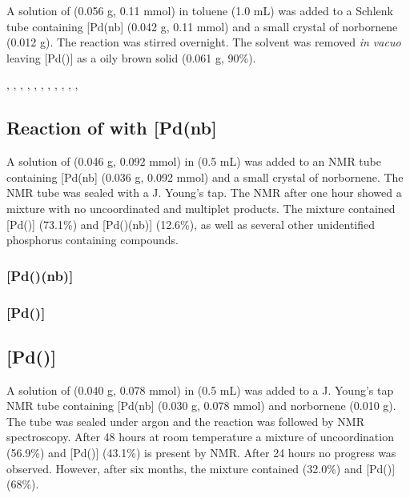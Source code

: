 A solution of \tButhixantphos{} (0.056 g, 0.11 mmol) in toluene (1.0 mL) was added to a Schlenk tube containing [Pd(nb] (0.042 g, 0.11 mmol) and a small crystal of norbornene (0.012 g).  The reaction was stirred overnight.  The solvent was removed \emph{in vacuo} leaving [Pd(\tButhixantphos)] as a oily brown solid (0.061 g, 90\%).

,
,
,
,
,
,
,
,
,
,
,

\subsection*{Reaction of \tBuxantphos{} with [Pd(nb]}

A solution of \tBuxantphos{} (0.046 g, 0.092 mmol) in  (0.5 mL) was added to an NMR tube containing [Pd(nb] (0.036 g, 0.092 mmol) and a small crystal of norbornene.  The NMR tube was sealed with a J. Young's tap.  The NMR after one hour showed a mixture with no uncoordinated \tBuxantphos{} and multiplet products.  The mixture contained [Pd(\tBuxantphos)] (73.1\%) and [Pd(\tBuxantphos)(nb)] (12.6\%), as well as several other unidentified phosphorus containing compounds.  

\subsubsection*{[Pd(\tBuxantphos)(nb)]}


\subsubsection*{[Pd(\tBuxantphos)]}


\subsection*{[Pd(\tBusixantphos)]}

A solution of \tBusixantphos{} (0.040 g, 0.078 mmol) in  (0.5 mL) was added to a J. Young's tap NMR tube containing [Pd(nb] (0.030 g, 0.078 mmol) and norbornene (0.010 g).  The tube was sealed under argon and the reaction was followed by NMR spectroscopy.  After 48 hours at room temperature a mixture of uncoordination \tBusixantphos{} (56.9\%) and [Pd(\tBusixantphos)] (43.1\%) is present by \phosphorus{} NMR.  After 24 hours no progress was observed.  However, after six months, the mixture contained \tBusixantphos{} (32.0\%) and [Pd(\tBusixantphos)] (68\%).  

